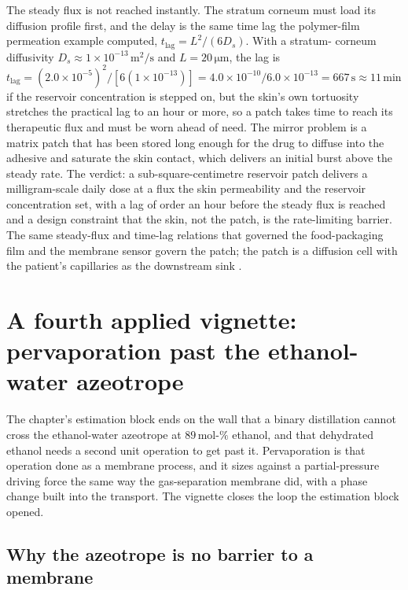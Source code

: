 The steady flux is not reached instantly. The stratum corneum must load its
diffusion profile first, and the delay is the same time lag the polymer-film
permeation example computed, $t_{\text{lag}} = L^2/(6 D_s)$. With a stratum-
corneum diffusivity $D_s \approx 1\times 10^{-13}\,\si{\meter\squared\per
\second}$ and $L = 20\,\si{\micro\meter}$, the lag is $t_{\text{lag}} =
(2.0\times 10^{-5})^2/[6(1\times 10^{-13})] = 4.0\times 10^{-10}/6.0\times
10^{-13} = 667\,\text{s} \approx 11\,\text{min}$ if the reservoir concentration
is stepped on, but the skin's own tortuosity stretches the practical lag to an
hour or more, so a patch takes time to reach its therapeutic flux and must be
worn ahead of need. The mirror problem is a matrix patch that has been stored
long enough for the drug to diffuse into the adhesive and saturate the skin
contact, which delivers an initial burst above the steady rate. The verdict: a
sub-square-centimetre reservoir patch delivers a milligram-scale daily dose at
a flux the skin permeability and the reservoir concentration set, with a lag of
order an hour before the steady flux is reached and a design constraint that
the skin, not the patch, is the rate-limiting barrier. The same steady-flux and
time-lag relations that governed the food-packaging film and the membrane
sensor govern the patch; the patch is a diffusion cell with the patient's
capillaries as the downstream sink \cite{text:bird-transport-phenomena}.

\section{A fourth applied vignette: pervaporation past the ethanol-water
azeotrope}

The chapter's estimation block ends on the wall that a binary distillation
cannot cross the ethanol-water azeotrope at $89\,\text{mol-}\%$ ethanol, and
that dehydrated ethanol needs a second unit operation to get past it.
Pervaporation is that operation done as a membrane process, and it sizes
against a partial-pressure driving force the same way the gas-separation
membrane did, with a phase change built into the transport. The vignette closes
the loop the estimation block opened.

\subsection*{Why the azeotrope is no barrier to a membrane}

